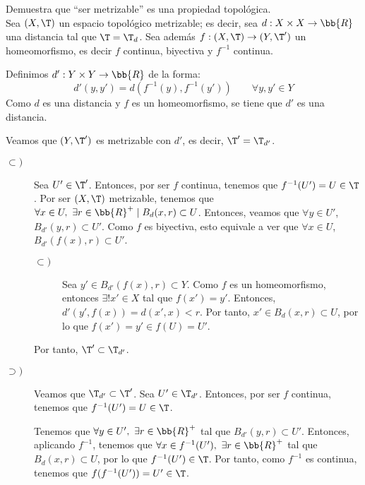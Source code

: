 \begin{ejercicio}
    Demuestra que ``ser metrizable'' es una propiedad topológica.\\

    Sea $(X,\T)$ un espacio topológico metrizable; es decir, sea $d:X\times X\to \bb{R}$ una distancia tal que $\T=\T_d$. Sea además $f:(X,\T)\to (Y,\T')$ un homeomorfismo, es decir $f$ continua, biyectiva y $f^{-1}$ continua.

    Definimos $d':Y\times Y\to \bb{R}$ de la forma:
    \begin{equation*}
        d'(y,y')=d(f^{-1}(y),f^{-1}(y')) \qquad \forall y,y'\in Y
    \end{equation*}
    Como $d$ es una distancia y $f$ es un homeomorfismo, se tiene que $d'$ es una distancia.
    
    Veamos que $(Y,\T')$ es metrizable con $d'$, es decir, $\T'=\T_{d'}$.
    \begin{description}
        \item[$\subset)$]
        Sea $U'\in \T'$. Entonces, por ser $f$ continua, tenemos que $f^{-1}(U')=U\in \T$. Por ser $(X,\T)$ metrizable, tenemos que $\forall x\in U,~\exists r\in \bb{R}^+\mid B_d(x,r)\subset U$. Entonces, veamos que $\forall y\in U'$, $B_{d'}(y,r)\subset U'$. Como $f$ es biyectiva, esto equivale a ver que $\forall x\in U$, $B_{d'}(f(x),r)\subset U'$.
        \begin{description}
            \item[$\subset)$] Sea $y'\in B_{d'}(f(x),r)\subset Y$. Como $f$ es un homeomorfismo, entonces $\exists! x'\in X$ tal que $f(x')=y'$. Entonces, $d'(y',f(x))=d(x',x)<r$. Por tanto, $x'\in B_d(x,r)\subset U$, por lo que $f(x')=y'\in f(U)=U'$.
        \end{description}
        Por tanto, $\T'\subset \T_{d'}$.

        \item[$\supset)$] Veamos que $\T_{d'}\subset \T'$. Sea $U'\in \T_{d'}$. Entonces, por ser $f$ continua, tenemos que $f^{-1}(U')=U\in \T$.
        
         Tenemos que $\forall y\in U',~\exists r\in \bb{R}^+$ tal que $B_{d'}(y,r)\subset U'$. Entonces, aplicando $f^{-1}$, tenemos que $\forall x\in f^{-1}(U'),~\exists r\in \bb{R}^+$ tal que $B_{d}(x,r)\subset U$, por lo que $f^{-1}(U')\in \T$. Por tanto, como $f^{-1}$ es continua, tenemos que $f(f^{-1}(U'))=U'\in \T$.
    \end{description}
\end{ejercicio}

